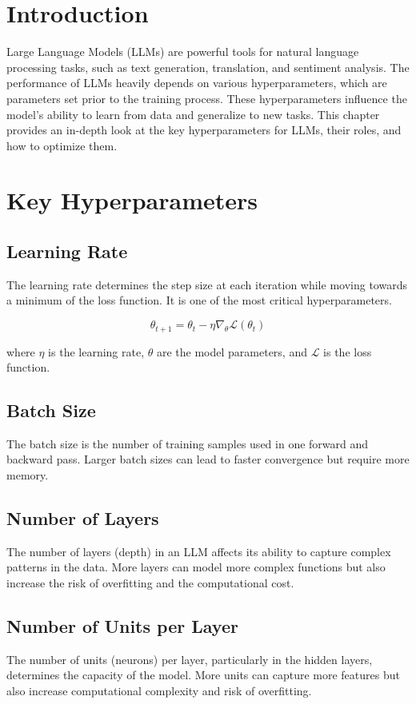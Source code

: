 \section{Introduction}
Large Language Models (LLMs) are powerful tools for natural language processing tasks, such as text generation, translation, and sentiment analysis. The performance of LLMs heavily depends on various hyperparameters, which are parameters set prior to the training process. These hyperparameters influence the model's ability to learn from data and generalize to new tasks. This chapter provides an in-depth look at the key hyperparameters for LLMs, their roles, and how to optimize them.

\section{Key Hyperparameters}

\subsection{Learning Rate}
The learning rate determines the step size at each iteration while moving towards a minimum of the loss function. It is one of the most critical hyperparameters.

\begin{equation}
\theta_{t+1} = \theta_t - \eta \nabla_\theta \mathcal{L}(\theta_t)
\end{equation}

where \( \eta \) is the learning rate, \( \theta \) are the model parameters, and \( \mathcal{L} \) is the loss function.

\subsection{Batch Size}
The batch size is the number of training samples used in one forward and backward pass. Larger batch sizes can lead to faster convergence but require more memory.

\subsection{Number of Layers}
The number of layers (depth) in an LLM affects its ability to capture complex patterns in the data. More layers can model more complex functions but also increase the risk of overfitting and the computational cost.

\subsection{Number of Units per Layer}
The number of units (neurons) per layer, particularly in the hidden layers, determines the capacity of the model. More units can capture more features but also increase computational complexity and risk of overfitting.

